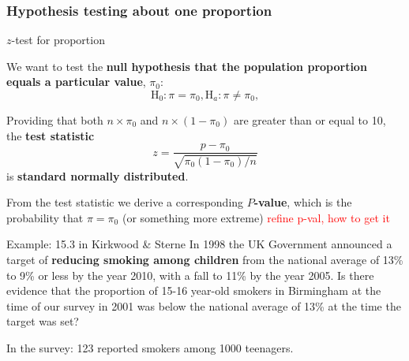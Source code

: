\documentclass[compress, notes=hide]{beamer}
\newcommand{\hl}[1]{\textbf{#1}}
\begin{document}

\begin{frame}
\frametitle{Hypothesis testing about one proportion}
\begin{block}{$z$-test for proportion}
	
	We want to test the \hl{null hypothesis that the population proportion
		equals a particular value}, $\pi_0$:
	\begin{equation}
		\mathrm{H}_0: \pi = \pi_0, \mathrm{H}_a: \pi \neq \pi_0,\nonumber
	\end{equation}

Providing that both $n \times \pi_0$ and $n \times (1-\pi_0)$
are greater than or equal to 10, the \hl{test statistic}
\begin{equation}
	z = \frac{p - \pi_0}{\sqrt{\pi_0 (1-\pi_0)/n}} \nonumber
\end{equation}
is \hl{standard normally distributed}.

From the test statistic we derive a corresponding
\hl{$P$-value}, which is the probability that $\pi = \pi_0$ (or
something more extreme) \textcolor{red}{refine p-val, how to get it}

\end{block}
\end{frame}

\begin{frame}
\begin{block}{Example: 15.3 in Kirkwood \& Sterne}
  In 1998 the UK Government announced a target of \hl{reducing
    smoking among children} from the national average of 13\% to 9\%
  or less by the year 2010, with a fall to 11\% by the year 2005. Is
  there evidence that the proportion of 15-16 year-old smokers in
  Birmingham at the time of our survey in 2001 was below the national
  average of 13\% at the time the target was set?
  
  \vspace{0.2cm}
  
  In the survey: 123 reported smokers among 1000 teenagers. 
\end{block}
\end{frame}
\end{document}
